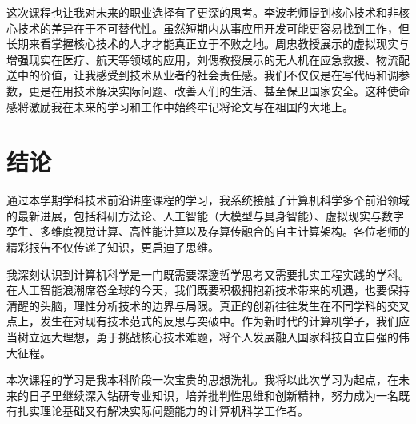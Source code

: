 \documentclass[zihao=-4, linespread=1.5]{ctexart}
\begin{document}
这次课程也让我对未来的职业选择有了更深的思考。李波老师提到核心技术和非核心技术的差异在于不可替代性。虽然短期内从事应用开发可能更容易找到工作，但长期来看掌握核心技术的人才才能真正立于不败之地。周忠教授展示的虚拟现实与增强现实在医疗、航天等领域的应用，刘偲教授展示的无人机在应急救援、物流配送中的价值，让我感受到技术从业者的社会责任感。我们不仅仅是在写代码和调参数，更是在用技术解决实际问题、改善人们的生活、甚至保卫国家安全。这种使命感将激励我在未来的学习和工作中始终牢记将论文写在祖国的大地上。

\section{结论}

通过本学期学科技术前沿讲座课程的学习，我系统接触了计算机科学多个前沿领域的最新进展，包括科研方法论、人工智能（大模型与具身智能）、虚拟现实与数字孪生、多维度视觉计算、高性能计算以及存算传融合的自主计算架构。各位老师的精彩报告不仅传递了知识，更启迪了思维。

我深刻认识到计算机科学是一门既需要深邃哲学思考又需要扎实工程实践的学科。在人工智能浪潮席卷全球的今天，我们既要积极拥抱新技术带来的机遇，也要保持清醒的头脑，理性分析技术的边界与局限。真正的创新往往发生在不同学科的交叉点上，发生在对现有技术范式的反思与突破中。作为新时代的计算机学子，我们应当树立远大理想，勇于挑战核心技术难题，将个人发展融入国家科技自立自强的伟大征程。

本次课程的学习是我本科阶段一次宝贵的思想洗礼。我将以此次学习为起点，在未来的日子里继续深入钻研专业知识，培养批判性思维和创新精神，努力成为一名既有扎实理论基础又有解决实际问题能力的计算机科学工作者。
\end{document}
